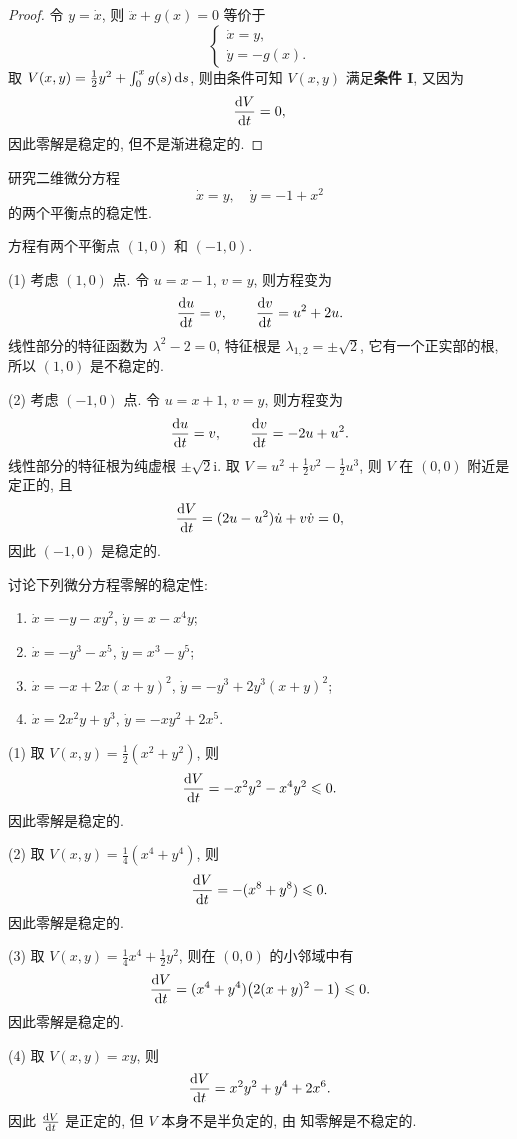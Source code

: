 \begin{proof}
  令 $y = \dot{x}$, 则 $\ddot{x} + g(x) = 0$ 等价于
  \[\begin{cases}
    \dot{x} = y, \\
    \dot{y} = -g(x).
  \end{cases}\]
  取 $V(x,y) = \frac{1}{2}y^2 + \int_0^x g(s) \mathop{}\!\mathrm{d} s$, 则由条件可知
  $V(x,y)$ 满足\textbf{条件 I}, 又因为
  \[\frac{\mathop{}\!\mathrm{d} V}{\mathop{}\!\mathrm{d} t} = 0,\]
  因此零解是稳定的, 但不是渐进稳定的.
\end{proof}



\begin{exercise}
  研究二维微分方程
  \[\dot{x} = y,\quad \dot{y} = -1+x^2\]
  的两个平衡点的稳定性.
\end{exercise}

\begin{solution}
  方程有两个平衡点 $(1,0)$ 和 $(-1,0)$.

  (1) 考虑 $(1,0)$ 点. 令 $u = x-1$, $v = y$, 则方程变为
  \[\frac{\mathop{}\!\mathrm{d} u}{\mathop{}\!\mathrm{d} t} = v,\qquad \frac{\mathop{}\!\mathrm{d} v}{\mathop{}\!\mathrm{d} t} = u^2+2u.\]
  线性部分的特征函数为 $\lambda^2-2=0$, 特征根是 $\lambda_{1,2} = \pm\sqrt{2}$,
  它有一个正实部的根, 所以 $(1,0)$ 是不稳定的.

  (2) 考虑 $(-1,0)$ 点. 令 $u = x+1$, $v=y$, 则方程变为
  \[\frac{\mathop{}\!\mathrm{d} u}{\mathop{}\!\mathrm{d} t} = v,\qquad \frac{\mathop{}\!\mathrm{d} v}{\mathop{}\!\mathrm{d} t} = -2u + u^2.\]
  线性部分的特征根为纯虚根 $\pm\sqrt{2}\mathrm{i}$.
  取 $V = u^2 + \frac{1}{2}v^2 -\frac{1}{2}u^3$, 则 $V$ 在 $(0,0)$
  附近是定正的, 且
  \[\frac{\mathop{}\!\mathrm{d} V}{\mathop{}\!\mathrm{d} t} = (2u-u^2) \dot{u} + v\dot{v} = 0,\]
  因此 $(-1,0)$ 是稳定的.
\end{solution}



\begin{exercise}
  讨论下列微分方程零解的稳定性:
  \begin{enumerate}[(1)]
    \item $\dot{x} = -y-xy^2$, $\dot{y} = x-x^4y$;
    \item $\dot{x} = -y^3-x^5$, $\dot{y} = x^3-y^5$;
    \item $\dot{x} = -x+2x(x+y)^2$, $\dot{y} = -y^3+2y^3(x+y)^2$;
    \item $\dot{x} = 2x^2y+y^3$, $\dot{y} = -xy^2 + 2x^5$.
  \end{enumerate}
\end{exercise}

\begin{solution}
  (1) 取 $V(x,y) = \frac12 (x^2+y^2)$, 则
  \[\frac{\mathop{}\!\mathrm{d} V}{\mathop{}\!\mathrm{d} t} = -x^2 y^2 - x^4y^2 \leqslant 0.\]
  因此零解是稳定的.

  (2) 取 $V(x,y) = \frac{1}{4}(x^4+y^4)$, 则
  \[\frac{\mathop{}\!\mathrm{d} V}{\mathop{}\!\mathrm{d} t} = -(x^8+y^8) \leqslant 0.\]
  因此零解是稳定的.

  (3) 取 $V(x,y) = \frac14 x^4 + \frac12 y^2$, 则在 $(0,0)$ 的小邻域中有
  \[\frac{\mathop{}\!\mathrm{d} V}{\mathop{}\!\mathrm{d} t} = (x^4+y^4) \bigl(2(x+y)^2 - 1\bigr) \leqslant 0.\]
  因此零解是稳定的.

  (4) 取 $V(x,y) = xy$, 则
  \[\frac{\mathop{}\!\mathrm{d} V}{\mathop{}\!\mathrm{d} t} = x^2y^2 + y^4 + 2x^6.\]
  因此 $\frac{\mathop{}\!\mathrm{d} V}{\mathop{}\!\mathrm{d} t}$ 是正定的, 但 $V$ 本身不是半负定的,
  由 \cite[定理 3.3]{Ma-Zhou-Li} 知零解是不稳定的.
\end{solution}


